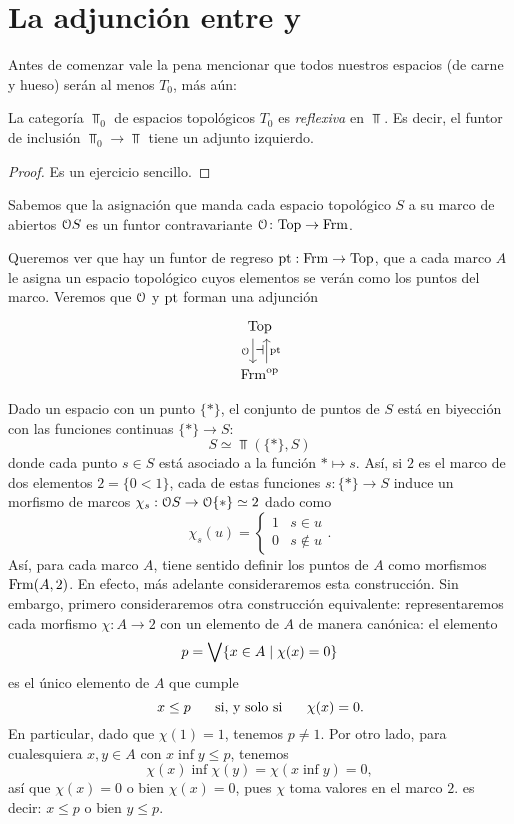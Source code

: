 \chapter{La adjunción entre  y }
Antes de comenzar vale la pena mencionar que todos nuestros espacios (de carne y hueso) ser\'an al menos $T_{0}$, más aún:

\begin{thm}\label{tcero}
    La categoría $\Top_0$ de espacios topológicos
    $T_0$  es \emph{reflexiva} en $\Top$.
    Es decir, el funtor de inclusión $\Top_0\to\Top$
    tiene un adjunto izquierdo.
\end{thm}

\begin{proof}
Es un ejercicio sencillo.
\end{proof}
Sabemos que la asignación que manda cada espacio topológico $S$ a su marco de
abiertos $\cal OS$ es un funtor contravariante
$\cal O\colon\Top\to\Frm$.

Queremos ver que hay un funtor de regreso $\pt:\Frm\to\Top$, que
a cada marco $A$ le asigna un espacio topológico cuyos elementos
se verán como los puntos del marco.
Veremos que $\cal O$ y $\pt$ forman una adjunción
\[
\begin{tikzcd}
\Top \ar[d,shift right=2,"\cal O"'{name=L}]
\\
\Frm^\op \ar[u,shift right=2,"\pt"'{name=R}]
\adj{L}{R}
\end{tikzcd}
\]

Dado un espacio con un punto $\{*\}$, el conjunto de
puntos de $S$ está en biyección con las funciones continuas
$\{*\}\to S$:
\[
  S \simeq \Top(\{*\},S)
\]
donde cada punto $s\in S$ está asociado a la función $*\mapsto
s$.
Así, si $2$ es el marco de dos elementos $2=\{0<1\}$,
cada de estas funciones $s:\{*\}\to S$ induce un morfismo de
marcos $\chi_s:\cal OS\to\cal O\{*\}\simeq 2$ dado como
\[
  \chi_s(u) =
  \begin{cases}
    1 & s\in u \\
    0 & s\not\in u
  \end{cases}
.\]
Así, para cada marco $A$, tiene sentido definir los puntos de $A$
como morfismos $\Frm(A,2)$.
En efecto, más adelante consideraremos esta construcción.
Sin embargo, primero consideraremos otra construcción equivalente:
representaremos cada morfismo $\chi:A\to 2$ con un elemento de
$A$ de manera canónica: el elemento
\[
    p = \Sup\{x\in A\mid \chi(x)=0\}
\]
es el único elemento de $A$ que cumple
\[
    x\leq p \ssi \chi(x) = 0
.\]
En particular, dado que $\chi(1)=1$, tenemos $p\neq 1$.
Por otro lado, para cualesquiera $x,y\in A$ con
$x\inf y\leq p$, tenemos
\[
    \chi(x)\inf\chi(y)=\chi(x\inf y)=0
,\]
así que $\chi(x)=0$ o bien $\chi(x)=0$, pues $\chi$ toma valores
en el marco $2$. es decir: $x\leq p$ o bien $y\leq p$.

